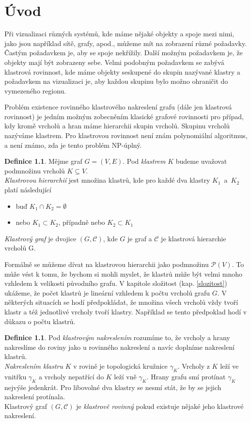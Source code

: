 \documentclass[12pt,a4report]{report}
\theoremstyle{definition}
\newtheorem{defn}[theorem]{Definice}
\begin{document}
\author{Filip Šedivý}

\chapter{Úvod}

Při vizualizaci různých systémů, kde máme nějaké objekty a spoje mezi nimi, jako jsou například sítě, grafy, apod., můžeme mít na zobrazení různé požadavky. Častým požadavkem je, aby se spoje nekřížily. Další možným požadavkem je, že objekty mají být zobrazeny  sebe. Velmi podobným požadavkem se zabývá klastrová rovinnost, kde máme objekty seskupené do skupin nazývané klastry a požadavkem na vizualizaci je, aby každou skupinu bylo možno ohraničit do vymezeného regionu.

Problém existence rovinného klastrového nakreslení grafu (dále jen klastrová rovinnost) je jedním možným zobecněním klasické grafové rovinnosti pro případ, kdy kromě vrcholů a hran máme hierarchii skupin vrcholů. Skupinu vrcholů nazýváme klastrem. Pro klastrovou rovinnost není znám polynomiální algoritmus, a není známo, zda je tento problém NP-úplný. 

\begin{defn}
Mějme graf $G=(V,E)$. Pod \textit{klastrem} $K$ budeme uvažovat podmnožinu vrcholů  $K \subseteq V$. \\
\textit{Klastrovou hierarchií} jest množina klastrů, kde pro každé dva klastry $K_1$~a~$K_2$ platí následující
\begin{itemize}
\item buď $K_1 \cap K_2 = \emptyset$
\item nebo $K_1 \subset K_2$, případně nebo $K_2 \subset K_1$
\end{itemize}
\textit{Klastrový graf} je dvojice $(G,\mathcal C)$, kde $G$ je graf a $\mathcal C$ je klastrová hierarchie vrcholů G.
\end{defn}

Formálně se můžeme dívat na klastrovou hierarchii jako podmnožinu $\mathcal P (V)$. To může vést k tomu, že bychom si mohli myslet, že klastrů může být velmi mnoho vzhledem k velikosti původního grafu. V kapitole složitost (kap. \ref{slozitost}) ukážeme, že počet klastrů je lineární vzhledem k počtu vrcholů grafu $G$. V některých situacích se hodí předpokládat, že množina všech vrcholů vždy tvoří klastr a též jednotlivé vrcholy tvoří klastry. Například se tento předpoklad  hodí v důkazu o počtu klastrů.

\begin{defn}
Pod \textit{klastrovým nakreslením} rozumíme to, že vrcholy a hrany nakreslíme do roviny jako u rovinného nakreslení a navíc doplníme nakreslení klastrů.\\ 
\textit{Nakreslením klastru} $K$ v rovině je topologická kružnice $\gamma_K$. Vrcholy z $K$ leží ve vnitřku $\gamma_K$ a vrcholy nepatřící do $K$ leží vně $\gamma_K$. Hrany grafu smí protínat $\gamma_K$ nejvýše jedenkrát. Pro libovolné dva klastry se nesmí stát, že by se jejich nakreslení protínala.\\
Klastrový graf $(G,\mathcal C)$ je \textit{klastrově rovinný} pokud existuje nějaké jeho klastrové nakreslení.
\end{defn}
\end{document}

